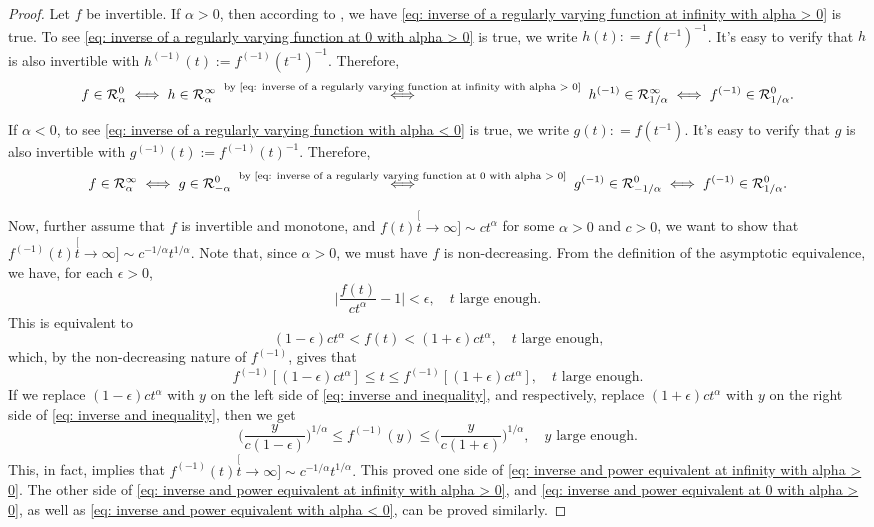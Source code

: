 \documentclass[12pt, a4paper]{amsart}
\theoremstyle{definition}
\numberwithin{equation}{section}
\begin{document}
\begin{proof}
	Let $f$ be invertible.
	If $\alpha>0$, then according to \cite[Theorem 1.5.12.]{BinghamGoldieTeugels1989Regular}, we have \eqref{eq: inverse of a regularly varying function at infinity with alpha > 0} is true.
	To see 	\eqref{eq: inverse of a regularly varying function at 0 with alpha > 0} is true, we write $h(t) : = f(t^{-1})^{-1}$.
	It's easy to verify that $h$ is also invertible with $h^{(-1)}(t) := f^{(-1)}(t^{-1})^{-1} $.
	Therefore,
\[
	f
	\in \mathcal R^0_{\alpha}
	\iff h
	\in \mathcal R^\infty_{\alpha}
	\stackrel{  \text{ by \eqref{eq: inverse of a regularly varying function at infinity with alpha > 0} }   }{\iff} h^{(-1)}
	\in \mathcal R^\infty_{1/\alpha}
	\iff f^{(-1)}
	\in \mathcal R^0_{1/\alpha}.
\]

	If $\alpha < 0$, to see	\eqref{eq: inverse of a regularly varying function with alpha < 0} is true, we write $g(t) : = f(t^{-1})$.
	It's easy to verify that $g$ is also invertible with $g^{(-1)}(t) := f^{(-1)}(t)^{-1}$.
	Therefore,
\[
	f
	\in \mathcal R^\infty_{\alpha}
	\iff g
	\in \mathcal R^0_{-\alpha}
	\stackrel{  \text{ by \eqref{eq: inverse of a regularly varying function at 0 with alpha > 0} }   }{\iff} g^{(-1)}
	\in \mathcal R^0_{-1/\alpha}
	\iff f^{(-1)}
	\in \mathcal R^0_{1/\alpha}.
\]
	
	Now, further assume that $f$ is invertible and monotone, and $f(t) \stackrel[t\to \infty]{}{\sim} c t^\alpha$ for some $\alpha > 0$ and $c > 0$, we want to show that $f^{(-1)}(t) \stackrel[t\to \infty]{}{\sim} c^{-1/\alpha} t^{1/\alpha}$.
	Note that, since $\alpha >0$, we must have $f$ is non-decreasing.
	From the definition of the asymptotic equivalence, we have, for each $\epsilon> 0$,
\[
	\big|\frac{f(t)}{c t^\alpha} - 1\big|
	< \epsilon,
	\quad t \text{ large enough.}
\]
	This is equivalent to
\[
	(1-\epsilon) c t^{\alpha}
	< f(t)
	< (1+ \epsilon)c t^{\alpha},
	\quad t \text{ large enough,}
\]
	which, by the non-decreasing nature of $f^{(-1)}$, gives that
\[\label{eq: inverse and inequality}
	f^{(-1)}[(1-\epsilon) c t^{\alpha}] \leq t \leq f^{(-1)}[(1+ \epsilon)c t^{\alpha}], \quad t \text{ large enough.}
\]
	If we replace $(1-\epsilon) c t^{\alpha}$ with $y$ on the left side of \eqref{eq: inverse and inequality}, and respectively, replace $(1+\epsilon) c t^{\alpha}$ with $y$ on the right side of \eqref{eq: inverse and inequality}, then we get
\[
	\Big(\frac{y}{c(1-\epsilon)}\Big)^{1/\alpha}
	\leq f^{(-1)}(y) \leq \Big(\frac{y}{c(1+\epsilon)}\Big)^{1/\alpha},
	\quad y \text{ large enough.}
\]
	This, in fact, implies that $ f^{(-1)}(t) \stackrel[t\to \infty]{}{\sim} c^{-1/\alpha} t^{1/\alpha}. $
	This proved one side of \eqref{eq: inverse and power equivalent at infinity with alpha > 0}.
	The other side of \eqref{eq: inverse and power equivalent at infinity with alpha > 0}, and \eqref{eq: inverse and power equivalent at 0 with alpha > 0}, as well as \eqref{eq: inverse and power equivalent with alpha < 0}, can be proved similarly.
\end{proof}
\end{document}
